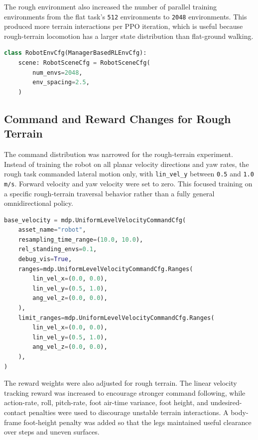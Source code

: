 The rough environment also increased the number of parallel training environments from the flat task's
\texttt{512} environments to \texttt{2048} environments. This produced more terrain interactions per PPO
iteration, which is useful because rough-terrain locomotion has a larger state distribution than
flat-ground walking.

\begin{lstlisting}[language=Python,caption={Increased parallel environments for rough-terrain training.}]
class RobotEnvCfg(ManagerBasedRLEnvCfg):
    scene: RobotSceneCfg = RobotSceneCfg(
        num_envs=2048,
        env_spacing=2.5,
    )
\end{lstlisting}

\subsection{Command and Reward Changes for Rough Terrain}

The command distribution was narrowed for the rough-terrain experiment. Instead of training the robot on
all planar velocity directions and yaw rates, the rough task commanded lateral motion only, with
\texttt{lin\_vel\_y} between \texttt{0.5} and \texttt{1.0 m/s}. Forward velocity and yaw velocity were set
to zero. This focused training on a specific rough-terrain traversal behavior rather than a fully general
omnidirectional policy.

\begin{lstlisting}[language=Python,caption={Velocity command range used in the rough task.}]
base_velocity = mdp.UniformLevelVelocityCommandCfg(
    asset_name="robot",
    resampling_time_range=(10.0, 10.0),
    rel_standing_envs=0.1,
    debug_vis=True,
    ranges=mdp.UniformLevelVelocityCommandCfg.Ranges(
        lin_vel_x=(0.0, 0.0),
        lin_vel_y=(0.5, 1.0),
        ang_vel_z=(0.0, 0.0),
    ),
    limit_ranges=mdp.UniformLevelVelocityCommandCfg.Ranges(
        lin_vel_x=(0.0, 0.0),
        lin_vel_y=(0.5, 1.0),
        ang_vel_z=(0.0, 0.0),
    ),
)
\end{lstlisting}

The reward weights were also adjusted for rough terrain. The linear velocity tracking reward was increased
to encourage stronger command following, while action-rate, roll, pitch-rate, foot air-time variance, foot
height, and undesired-contact penalties were used to discourage unstable terrain interactions. A
body-frame foot-height penalty was added so that the legs maintained useful clearance over steps and
uneven surfaces.

